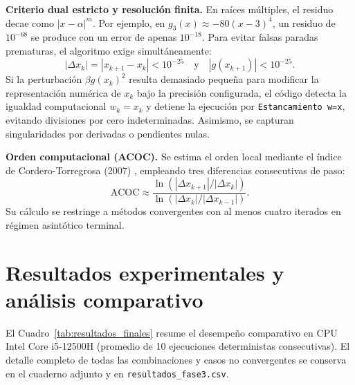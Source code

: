\documentclass[10pt,a4paper]{article}
\begin{document}
\textbf{Criterio dual estricto y resolución finita.} En raíces múltiples, el residuo decae como $|x-\alpha|^m$. Por ejemplo, en $g_3(x)\approx -80(x-3)^4$, un residuo de $10^{-68}$ se produce con un error de apenas $10^{-18}$. Para evitar falsas paradas prematuras, el algoritmo exige simultáneamente:
\[ |\Delta x_k| = |x_{k+1}-x_k| < 10^{-25} \quad \text{y} \quad |g(x_{k+1})| < 10^{-25}. \]
Si la perturbación $\beta g(x_k)^2$ resulta demasiado pequeña para modificar la representación numérica de $x_k$ bajo la precisión configurada, el código detecta la igualdad computacional $w_k=x_k$ y detiene la ejecución por \texttt{Estancamiento w=x}, evitando divisiones por cero indeterminadas. Asimismo, se capturan singularidades por derivadas o pendientes nulas.

\textbf{Orden computacional (ACOC).} Se estima el orden local mediante el índice de Cordero-Torregrosa (2007) \cite{cordero}, empleando tres diferencias consecutivas de paso:
\[ \mathrm{ACOC}\approx \frac{\ln(|\Delta x_{k+1}|/|\Delta x_k|)}{\ln(|\Delta x_k|/|\Delta x_{k-1}|)}. \]
Su cálculo se restringe a métodos convergentes con al menos cuatro iterados en régimen asintótico terminal.

\section{Resultados experimentales y análisis comparativo}
El Cuadro~\ref{tab:resultados_finales} resume el desempeño comparativo en CPU Intel Core i5-12500H (promedio de 10 ejecuciones deterministas consecutivas). El detalle completo de todas las combinaciones y casos no convergentes se conserva en el cuaderno adjunto y en \texttt{resultados\_fase3.csv}.
\end{document}

